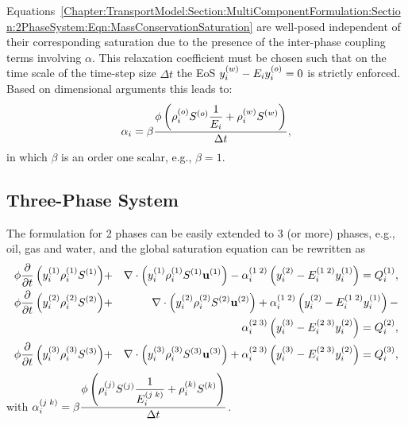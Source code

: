 Equations~\ref{Chapter:TransportModel:Section:MultiComponentFormulation:Section:2PhaseSystem:Eqn:MassConservationSaturation} are well-posed independent of their corresponding saturation due to the presence of the inter-phase coupling terms involving $\alpha$. This relaxation coefficient \blue{$\alpha$} must be chosen such that on the time scale of the time-step size $\Delta t$ the EoS $\mfr[y]{i}{w} - E_i \mfr[y]{i}{o}=0$ is strictly enforced. Based on dimensional arguments this leads to: 
            \begin{equation}
               \alpha_{i}= \beta \frc{\phi \left(\mfr[\rho]{i}{o}\mfr[S]{}{o} \frc{1}{E_i} +\mfr[\rho]{i}{w}\mfr[S]{}{w} \right)}{\Delta t} ,
            \end{equation}
in which $\beta$ is an order one scalar, e.g., $\beta=1$.


\subsection{Three-Phase System}\label{Chapter:TransportModel:Section:MultiComponentFormulation:Section:3PhaseSystem}

The formulation for 2 phases can be easily extended to 3 (or more) phases, e.g., oil, gas and water, and the global saturation equation can be rewritten as 
     \begin{eqnarray}
               \phi  \frc{\partial}{\partial t}\left(\mfr[y]{i}{1}\mfr[\rho]{i}{1}\mfr[S]{}{1} \right) &+& \nabla\cdot\left(\mfr[y]{i}{1}\mfr[\rho]{i}{1}\mfr[S]{}{1}\mfr[\mathbf{u}]{}{1}  \right) - \mfr[\alpha]{i}{1\;2} \left(\mfr[y]{i}{2} - \mfr[E]{i}{1\;2}\mfr[y]{i}{1}\right)  = \mfr[Q]{i}{1} ,\nonumber \label{phase1-comp-i} \\
               \phi \frc{\partial}{\partial t}\left(\mfr[y]{i}{2}\mfr[\rho]{i}{2}\mfr[S]{}{2} \right) &+&  \nabla\cdot\left( \mfr[y]{i}{2}\mfr[\rho]{i}{2}\mfr[S]{}{2}\mfr[\mathbf{u}]{}{2} \right) + \mfr[\alpha]{i}{1\;2} \left(\mfr[y]{i}{2} - \mfr[E]{i}{1\;2} \mfr[y]{i}{1}\right)   - \nonumber \\
              &&  \mfr[\alpha]{i}{2\;3} \left(\mfr[y]{i}{3} - \mfr[E]{i}{2\;3} \mfr[y]{i}{2}\right) = \mfr[Q]{i}{2} , \nonumber \label{phase2-comp-i} \\
               \phi \frc{\partial}{\partial t}\left(\mfr[y]{i}{3}\mfr[\rho]{i}{3}\mfr[S]{}{3} \right) &+&  \nabla\cdot\left( \mfr[y]{i}{3}\mfr[\rho]{i}{3}\mfr[S]{}{3}\mfr[\mathbf{u}]{}{3}  \right) +  \mfr[\alpha]{i}{2\;3} \left(\mfr[y]{i}{3} - \mfr[E]{i}{2\;3} \mfr[y]{i}{2}\right) = \mfr[Q]{i}{3}, \nonumber\label{phase3-comp-i}
    \end{eqnarray}
with $\mfr[\alpha]{i}{j\;k} = \beta \frc{\phi \left(\mfr[\rho]{i}{j}\mfr[S]{}{j}  \frc{1}{\mfr[E]{i}{j\;k}} +\mfr[\rho]{i}{k}\mfr[S]{}{k} \right)}{\Delta t} $.


